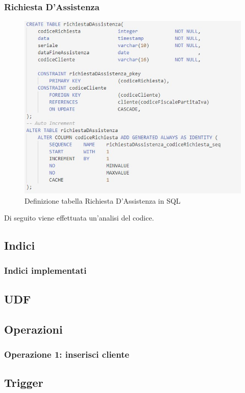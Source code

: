 \documentclass[legalpaper]{article}
\begin{document}
	\subsubsection{Richiesta D'Assistenza}
		\begin{figure}[h]
			\centering
			\includegraphics[width=0.9\linewidth]{Immagini SQL/richiestaDAssistenza}
			\caption{Definizione tabella Richiesta D'Assistenza in SQL}
			\label{richiestaDAssistenzasql}
		\end{figure}
		Di seguito viene effettuata un'analisi del codice. \\

\newpage		
\subsection{Indici}
\subsubsection{Indici implementati}
\subsection{UDF}
\subsection{Operazioni}
\subsubsection{Operazione 1: inserisci cliente}
\subsection{Trigger}
\end{document}
